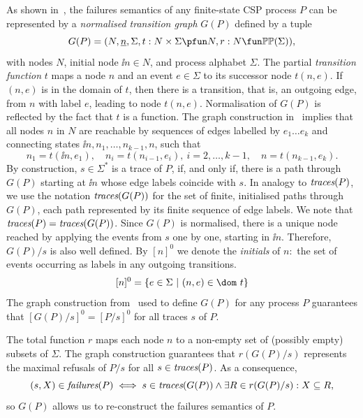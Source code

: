 As shown in~\cite{Roscoe:1994:chapter}, the failures semantics of any
finite-state CSP process $P$ can be represented by a \emph{normalised
transition graph} $G(P)$ defined by a tuple
$$
G(P) = ( N, \ii n, \Sigma, t : N\times\Sigma \pfun N, r : N \fun \mathbb{P}\mathbb{P}(\Sigma)),
$$
with nodes $N$, initial node $\ii n\in N$, and process alphabet $\Sigma$. The
partial \emph{transition function} $t$ maps a node $n$ and an event
$e\in\Sigma$ to its successor node $t(n,e)$. If $(n,e)$ is in the domain of
$t$, then there is a transition, that is, an outgoing edge, from $n$ with
label $e$, leading to node $t(n,e)$. Normalisation of $G(P)$ is reflected by
the fact that $t$ is a function. The graph construction
in~\cite{Roscoe:1994:chapter} implies that all nodes $n$ in $N$ are
reachable by sequences of edges labelled by $e_1\dots e_k$ and connecting
states $\ii n,n_1,\dots,n_{k-1},n$, such that
\[
n_1 = t(\ii n,e_1), \quad n_i = t(n_{i-1},e_i),\ i = 2,\dots,k-1,\quad
n= t(n_{k-1},e_k).
\]
%
By construction, $s\in\Sigma^*$ is a trace of $P$, if, and only if, there is
a path through $G(P)$ starting  at $\ii n$ whose edge labels coincide with
$s$. In analogy to $\text{\it traces}(P)$, we use the notation $\text{\it traces}(G(P))$ for the set of
finite, initialised paths through $G(P)$, each path represented by its finite
sequence of edge labels. We note that $\text{\it traces}(P) = \text{\it traces}(G(P))$. Since $G(P)$ is
normalised, there is a unique node reached by applying the events from $s$
one by one, starting in $\ii n$. Therefore, $G(P)/s$  is also well defined.
By $[n]^0$ we denote the \emph{initials} of $n$:~the set of events occurring
as labels in any outgoing transitions.
$$
[n]^0 = \{ e\in\Sigma~|~(n,e)\in\dom~t \}
$$
The graph construction from~\cite{Roscoe:1994:chapter} used to define
$G(P)$ for any process $P$ guarantees that $[G(P)/s]^0 = [P/s]^0$ for all
traces $s$ of $P$.

The total function $r$ maps each node $n$ to a non-empty set of  (possibly
empty) subsets of $\Sigma$. The graph construction guarantees that
$r(G(P)/s)$ represents the maximal refusals of $P/s$ for all $s\in\text{\it traces}(P)$.
As a consequence,
\begin{equation}\label{eq:refsAndR}
(s,X)\in\text{\it failures}(P) \iff s\in\text{\it traces}(G(P)) \wedge \exists R\in r(G(P)/s): X\subseteq R,
\end{equation}
so $G(P)$ allows us to re-construct the failures semantics of $P$.

